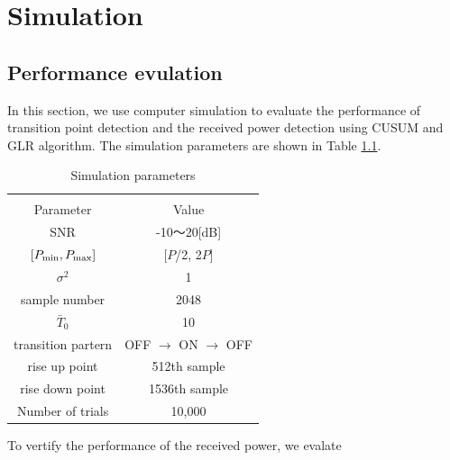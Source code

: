 \chapter[Simulation]{Simulation}
\label{chapter:Result}



\section{Performance evulation}
In this section, we use computer simulation to evaluate the performance of transition point detection and the received power detection using CUSUM and GLR algorithm. The simulation parameters are shown in Table \ref{parameter}.

\begin{table}[!htp]
\begin{center}
 \caption{\normalsize{Simulation parameters}}
 
\normalsize

  \begin{tabular}{c|c}
    & \\
    Parameter &Value \\ \hline
    SNR & -10〜20[dB] \\
    $[P_{{\rm min}},P_{{\rm max}}]$ & [$P$/2, 2$P$] \\
    $\sigma^2$ & 1 \\
    sample number & 2048 \\
    $\bar{T}_0$ & 10 \\
    transition partern & OFF $\rightarrow$ ON $\rightarrow$ OFF \\
    rise up point & 512th sample\\
    rise down point & 1536th sample\\
    Number of trials & 10,000 \\ \hline
  \end{tabular}
\label{parameter}
\end{center}
\end{table}

To vertify the performance of the received power, we evalate

